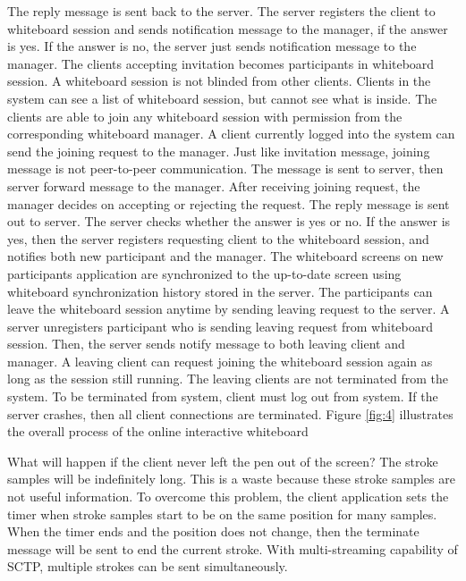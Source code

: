\documentclass[conference]{IEEEtran}
\begin{document}
The reply message is sent back to the server. 
The server registers the client to whiteboard session and sends notification message to the manager, if the answer is yes. 
If the answer is no, the server just sends notification message to the manager. 
The clients accepting invitation becomes participants in whiteboard session.
A whiteboard session is not blinded from other clients. 
Clients in the system can see a list of whiteboard session, but cannot see what is inside. 
The clients are able to join any whiteboard session with permission from the corresponding whiteboard manager. 
A client currently logged into the system can send the joining request to the manager. 
Just like invitation message, joining message is not peer-to-peer communication. 
The message is sent to server, then server forward message to the manager. 
After receiving joining request, the manager decides on accepting or rejecting the request. 
The reply message is sent out to server. 
The server checks whether the answer is yes or no. 
If the answer is yes, then the server registers requesting client to the whiteboard session, and notifies both new participant and the manager. 
The whiteboard screens on new participants application are synchronized to the up-to-date screen using whiteboard synchronization history stored in the server.
The participants can leave the whiteboard session anytime by sending leaving request to the server. 
A server unregisters participant who is sending leaving request from whiteboard session.
Then, the server sends notify message to both leaving client and manager. 
A leaving client can request joining the whiteboard session again as long as the session still running. 
The leaving clients are not terminated from the system. 
To be terminated from system, client must log out from system. 
If the server crashes, then all client connections are terminated. 
Figure \ref{fig:4} illustrates the overall process of the online interactive whiteboard

What will happen if the client never left the pen out of the screen? 
The stroke samples will be indefinitely long. 
This is a waste because these stroke samples are not useful information. 
To overcome this problem, the client application sets the timer when stroke samples start to be on the same position for many samples. 
When the timer ends and the position does not change, then the terminate message will be sent to end the current stroke. 
With multi-streaming capability of SCTP, multiple strokes can be sent simultaneously.
\end{document}
